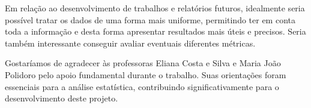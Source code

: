 \documentclass[%
 aip,
cp,  %
 amsmath,amssymb,%
 reprint,%
]{revtex4-2}
\begin{document}
Em relação ao desenvolvimento de trabalhos e relatórios futuros, idealmente seria possível tratar os dados de uma forma mais uniforme, permitindo ter em conta toda a informação e desta forma apresentar resultados mais úteis e precisos. Seria também interessante conseguir avaliar eventuais diferentes métricas.

    



\begin{acknowledgments}
Gostaríamos de agradecer às professoras Eliana Costa e Silva e Maria João Polidoro pelo apoio fundamental durante o trabalho. Suas orientações foram essenciais para a análise estatística, contribuindo significativamente para o desenvolvimento deste projeto.

\end{acknowledgments}


\nocite{overleaf, material}


\end{document}
